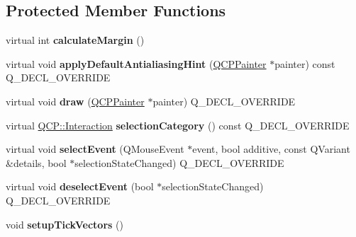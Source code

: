 \subsection*{Protected Member Functions}
\begin{DoxyCompactItemize}
\item 
\mbox{\label{class_q_c_p_axis_a47bdb0a55de6759489ee47665199aebb}} 
virtual int {\bfseries calculate\+Margin} ()
\item 
\mbox{\label{class_q_c_p_axis_adbaeffcdc2707f2bd5dc1bbd11236770}} 
virtual void {\bfseries apply\+Default\+Antialiasing\+Hint} (\hyperlink{class_q_c_p_painter}{Q\+C\+P\+Painter} $\ast$painter) const Q\+\_\+\+D\+E\+C\+L\+\_\+\+O\+V\+E\+R\+R\+I\+DE
\item 
\mbox{\label{class_q_c_p_axis_ac15ebb4225ca5212d8e5fffae481bc9b}} 
virtual void {\bfseries draw} (\hyperlink{class_q_c_p_painter}{Q\+C\+P\+Painter} $\ast$painter) Q\+\_\+\+D\+E\+C\+L\+\_\+\+O\+V\+E\+R\+R\+I\+DE
\item 
\mbox{\label{class_q_c_p_axis_ab751e3e96495716a2f6742ca7d7b3d49}} 
virtual \hyperlink{namespace_q_c_p_a2ad6bb6281c7c2d593d4277b44c2b037}{Q\+C\+P\+::\+Interaction} {\bfseries selection\+Category} () const Q\+\_\+\+D\+E\+C\+L\+\_\+\+O\+V\+E\+R\+R\+I\+DE
\item 
\mbox{\label{class_q_c_p_axis_a50c3ed18e189d48421ec2978f88e4f87}} 
virtual void {\bfseries select\+Event} (Q\+Mouse\+Event $\ast$event, bool additive, const Q\+Variant \&details, bool $\ast$selection\+State\+Changed) Q\+\_\+\+D\+E\+C\+L\+\_\+\+O\+V\+E\+R\+R\+I\+DE
\item 
\mbox{\label{class_q_c_p_axis_a5bc1f8a8d0fbc7658eba70c80279ed31}} 
virtual void {\bfseries deselect\+Event} (bool $\ast$selection\+State\+Changed) Q\+\_\+\+D\+E\+C\+L\+\_\+\+O\+V\+E\+R\+R\+I\+DE
\item 
\mbox{\label{class_q_c_p_axis_a57d9e961bae7d62f5b4e1f143e660c78}} 
void {\bfseries setup\+Tick\+Vectors} ()
\item 
\mbox{\label{class_q_c_p_axis_a8cd3764c6a4ce9c3d7d913e81cad0a50}} 

\end{DoxyCompactItemize}
